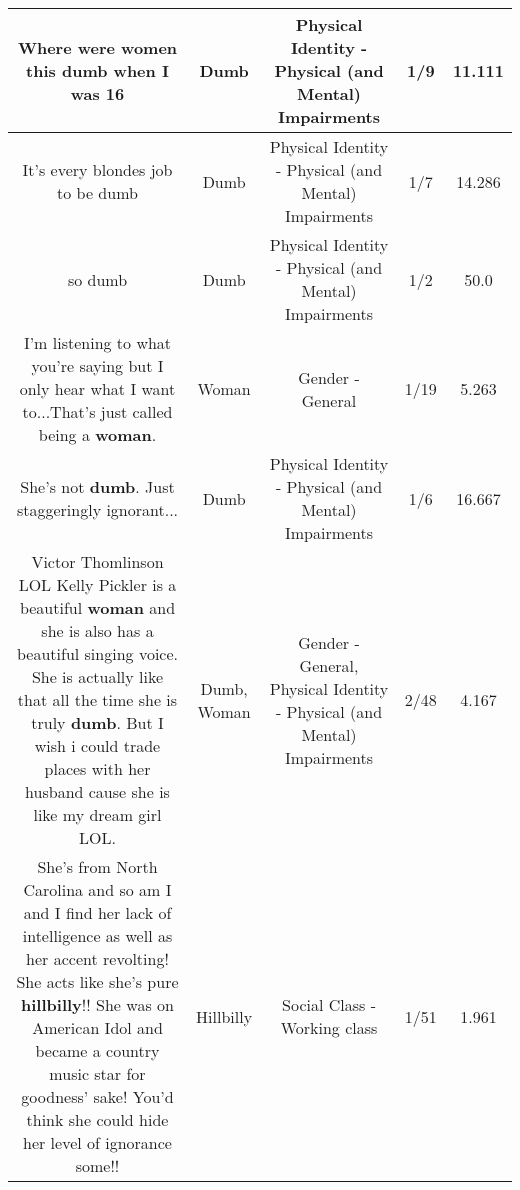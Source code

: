 \documentclass[11pt]{article}
\newlength\mylength
\begin{document}
\begin{center}
\begin{longtable}{|C{.65\mylength}|C{.30\mylength}|C{.12\mylength}|C{.12\mylength}|C{.12\mylength}|}
  \small Where were women this \textbf{dumb} when I was 16\normalsize   & Dumb & Physical Identity - Physical (and Mental) Impairments & 1/9 & 11.111 \\  \hline
  \small It's every blondes job to be dumb\normalsize   & Dumb & Physical Identity - Physical (and Mental) Impairments & 1/7 & 14.286 \\  \hline
  \small so dumb\normalsize   & Dumb & Physical Identity - Physical (and Mental) Impairments & 1/2 & 50.0 \\  \hline
  \small I'm listening to what you're saying but I only hear what I want to...That's just called being a \textbf{woman}.\normalsize   & Woman & Gender - General & 1/19 & 5.263 \\  \hline
  \small She's not \textbf{dumb}. Just staggeringly ignorant...\normalsize   & Dumb & Physical Identity - Physical (and Mental) Impairments & 1/6 & 16.667 \\  \hline
  \small Victor Thomlinson LOL Kelly Pickler is a beautiful \textbf{woman} and she is also has a beautiful singing voice. She is actually like that all the time she is truly \textbf{dumb}. But I wish i could trade places with her husband cause she is like my dream girl LOL.\normalsize   & Dumb, Woman & Gender - General, Physical Identity - Physical (and Mental) Impairments & 2/48 & 4.167 \\  \hline
  \small She's from North Carolina and so am I and I find her lack of intelligence as well as her accent revolting!  She acts like she's pure \textbf{hillbilly}!! She was on American Idol and became a country music star for goodness' sake! You'd think she could hide her level of ignorance some!!\normalsize   & Hillbilly & Social Class - Working class & 1/51 & 1.961 \\  \hline

\end{longtable}
\end{center}
\end{document}
